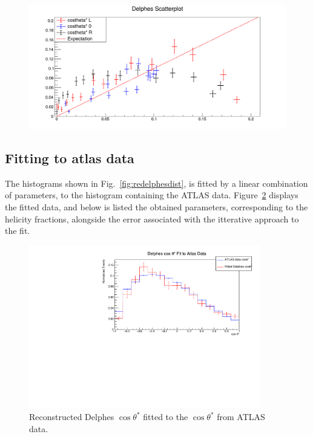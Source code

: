 \documentclass[12pt,a4paper]{article}
\numberwithin{equation}{section}
\begin{document}
\begin{figure}[H]
  \centering
  \includegraphics[width=\linewidth]{figures/scatterplot}
  \caption{\label{fig:scatterplot}}
\end{figure}

\subsection{Fitting to atlas data}
The histograms shown in Fig.~\ref{fig:redelphesdist}, is fitted by a linear
combination of parameters, to the histogram containing the ATLAS data.
Figure~\ref{fig:delphesfit} displays the fitted data, and below is listed the
obtained parameters, corresponding to the helicity fractions, alongside the
error associated with the itterative approach to the fit.\cleardoublepage{}

\begin{figure}[H]
  \centering
  \includegraphics[width=0.9\textwidth]{figures/delphes_fit}
  \caption{\label{fig:delphesfit}Reconstructed Delphes $\cos \theta^{*}$ fitted to
    the $\cos \theta^{*}$ from ATLAS data.}
\end{figure}
\end{document}
